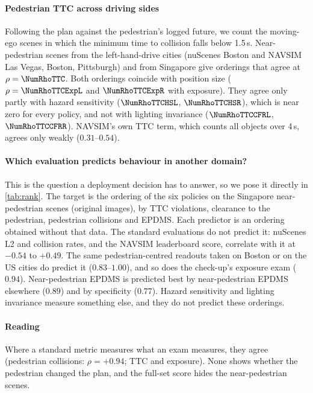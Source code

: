 \paragraph{Pedestrian TTC across driving sides}
Following the plan against the pedestrian's logged future, we count the moving-ego scenes in which the
minimum time to collision falls below 1.5\,s. Near-pedestrian scenes from the left-hand-drive cities
(nuScenes Boston and NAVSIM Las Vegas, Boston, Pittsburgh) and from Singapore give orderings that agree
at $\rho=\NumRhoTTC$. Both orderings coincide with position size ($\rho=\NumRhoTTCExpL$ and $\NumRhoTTCExpR$ with exposure).
They agree only partly with hazard sensitivity ($\NumRhoTTCHSL$, $\NumRhoTTCHSR$), which is near zero for
every policy, and not with lighting invariance ($\NumRhoTTCCFRL$, $\NumRhoTTCCFRR$). NAVSIM's own TTC
term, which counts all objects over 4\,s, agrees only weakly ($0.31$--$0.54$).



\paragraph{Which evaluation predicts behaviour in another domain?}
This is the question a deployment decision has to answer, so we pose it directly in \cref{tab:rank}.
The target is the ordering of the six policies on the Singapore near-pedestrian scenes (original images),
by TTC violations, clearance to the pedestrian, pedestrian collisions and EPDMS. Each predictor is an
ordering obtained without that data. The standard evaluations do not predict it: nuScenes L2 and
collision rates, and the NAVSIM leaderboard score, correlate with it at $-0.54$ to $+0.49$. The same
pedestrian-centred readouts taken on Boston or on the US cities do predict it ($0.83$--$1.00$), and so
does the check-up's exposure exam ($0.94$). Near-pedestrian EPDMS is predicted best by near-pedestrian
EPDMS elsewhere ($0.89$) and by specificity ($0.77$). Hazard sensitivity and lighting invariance measure
something else, and they do not predict these orderings.

\paragraph{Reading}
Where a standard metric measures what an exam measures, they agree (pedestrian collisions: $\rho=+0.94$;
TTC and exposure). None shows whether the pedestrian changed the plan, and the full-set score hides the
near-pedestrian scenes.
